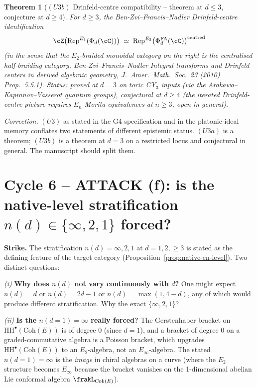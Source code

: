 \documentclass[11pt]{article}
\newtheorem{theorem}{Theorem}
\theoremstyle{definition}
\providecommand{\PhiFA}{\Phi^{\mathrm{FA}}}
\providecommand{\HH}{\mathrm{HH}}
\providecommand{\Coh}{\mathrm{Coh}}
\providecommand{\Rep}{\mathrm{Rep}}
\begin{document}
\begin{theorem}[$(U3b)$ Drinfeld-centre compatibility -- theorem at $d \leq 3$, conjecture at $d \geq 4$]
\label{thm:u3b-drinfeld-centre}
For $d \geq 3$, the Ben-Zvi--Francis--Nadler Drinfeld-centre
identification
\[
 \cZ\bigl(\Rep^{E_1}(\Phi_d(\cC))\bigr)
 \;\simeq\;
 \Rep^{E_2}\bigl(\PhiFA_d(\cC)\bigr)^{\mathrm{centred}}
\]
(in the sense that the $E_2$-braided monoidal category on the right
is the centralised half-braiding category, Ben-Zvi--Francis--Nadler
\emph{Integral transforms and Drinfeld centers in derived algebraic
geometry}, J.\ Amer.\ Math.\ Soc.\ 23 (2010) Prop.\ 5.5.1).
\emph{Status}: proved at $d = 3$ on toric CY$_3$ inputs (via the
Arakawa--Kapranov--Vasserot quantum groups), conjectural at $d \geq 4$
(the iterated Drinfeld-centre picture requires $E_n$ Morita
equivalences at $n \geq 3$, open in general).
\end{theorem}

\emph{Correction.} $(U3)$ as stated in the G4 specification and in the
platonic-ideal memory conflates two statements of different epistemic
status. $(U3a)$ is a theorem; $(U3b)$ is a theorem at $d = 3$ on a
restricted locus and conjectural in general. The manuscript should
split them.

\section*{Cycle 6 -- ATTACK (f): is the native-level stratification
$n(d) \in \{\infty, 2, 1\}$ forced?}

\noindent\textbf{Strike.} The stratification $n(d) = \infty, 2, 1$ at
$d = 1, 2, {\geq}3$ is stated as the defining feature of the
target category (Proposition~\ref{prop:native-en-level}).  Two
distinct questions:

\smallskip
\emph{(i)} \textbf{Why does $n(d)$ not vary continuously with $d$?}
One might expect $n(d) = d$ or $n(d) = 2d - 1$ or $n(d) = \max(1, 4-d)$,
any of which would produce different stratification. Why the exact
$\{\infty, 2, 1\}$?

\emph{(ii)} \textbf{Is the $n(d = 1) = \infty$ really forced?}
The Gerstenhaber bracket on $\HH^\bullet(\Coh(E))$ is of degree $0$
(since $d = 1$), and a bracket of degree $0$ on a graded-commutative
algebra is a Poisson bracket, which upgrades
$\HH^\bullet(\Coh(E))$ to an $E_2$-algebra, not an $E_\infty$-algebra.
The stated $n(d = 1) = \infty$ is the \emph{image} in chiral algebras
on a curve (where the $E_2$ structure becomes $E_\infty$ because the
bracket vanishes on the 1-dimensional abelian Lie conformal algebra
$\frakL_{\Coh(E)}$).
\end{document}
